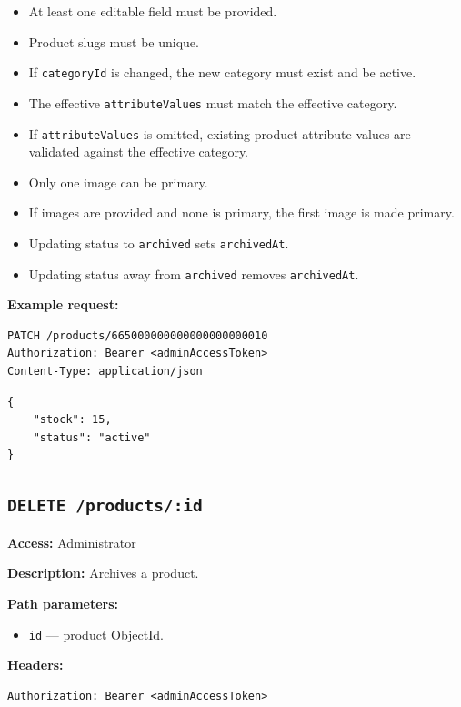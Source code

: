\begin{itemize}
    \item At least one editable field must be provided.
    \item Product slugs must be unique.
    \item If \texttt{categoryId} is changed, the new category must exist and be active.
    \item The effective \texttt{attributeValues} must match the effective category.
    \item If \texttt{attributeValues} is omitted, existing product attribute values are validated against the effective category.
    \item Only one image can be primary.
    \item If images are provided and none is primary, the first image is made primary.
    \item Updating status to \texttt{archived} sets \texttt{archivedAt}.
    \item Updating status away from \texttt{archived} removes \texttt{archivedAt}.
\end{itemize}

\textbf{Example request:}

\begin{verbatim}
PATCH /products/665000000000000000000010
Authorization: Bearer <adminAccessToken>
Content-Type: application/json
\end{verbatim}

\begin{verbatim}
{
    "stock": 15,
    "status": "active"
}
\end{verbatim}

\subsection{\texttt{DELETE /products/:id}}

\textbf{Access:} Administrator

\textbf{Description:} Archives a product.

\textbf{Path parameters:}

\begin{itemize}
    \item \texttt{id} --- product ObjectId.
\end{itemize}

\textbf{Headers:}

\begin{verbatim}
Authorization: Bearer <adminAccessToken>
\end{verbatim}

